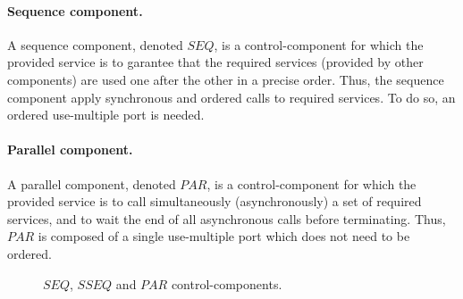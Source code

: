 \paragraph{Sequence component.} A sequence component, denoted $SEQ$, is a control-component for which the provided service is to garantee that the required services (provided by other components) are used one after the other in a precise order. Thus, the sequence component apply synchronous and ordered calls to required services. To do so, an ordered use-multiple port is needed.

\paragraph{Parallel component.} A parallel component, denoted $PAR$, is a control-component for which the provided service is to call simultaneously (asynchronously) a set of required services, and to wait the end of all asynchronous calls before terminating. Thus, $PAR$ is composed of a single use-multiple port which does not need to be ordered.

\begin{figure}[h!]
\captionsetup[subfigure]{labelformat=empty}

\begin{center}
\end{center}
\hspace{50pt}

\begin{center}
  \end{center}
\hspace{50pt}

\begin{center}
\end{center}
\caption{$SEQ$, $SSEQ$ and $PAR$ control-components.}
\label{fig:control}
\end{figure}

